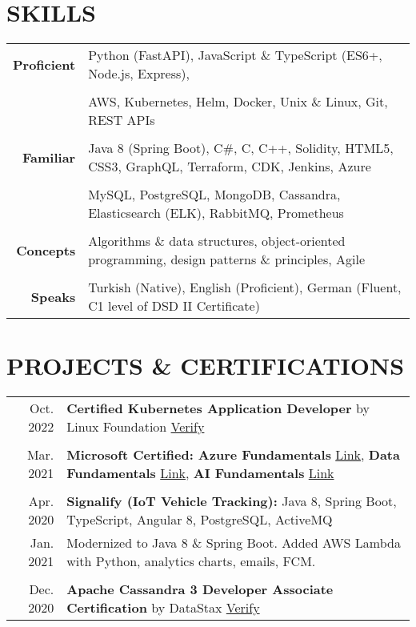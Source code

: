 \documentclass[a4paper, 10pt]{article}
\begin{document}
\section{SKILLS}
{\renewcommand{\arraystretch}{0.7}
\begin{tabular}{r p{15.4cm}}
    \textbf{Proficient} & Python (FastAPI), JavaScript \& TypeScript (ES6+, Node.js, Express),\\\\
    & AWS, Kubernetes, Helm, Docker, Unix \& Linux, Git, REST APIs\\\\
    \textbf{Familiar} & Java 8 (Spring Boot), C\#, C, C++, Solidity, HTML5, CSS3, GraphQL, Terraform, CDK, Jenkins, Azure\\\\
    & MySQL, PostgreSQL, MongoDB, Cassandra, Elasticsearch (ELK), RabbitMQ, Prometheus\\\\
    \textbf{Concepts} & Algorithms \& data structures, object-oriented programming, design patterns \& principles, Agile\\\\
    \textbf{Speaks} & Turkish (Native), English (Proficient), German (Fluent, C1 level of DSD II Certificate)
\end{tabular}}

\section{PROJECTS \& CERTIFICATIONS}
\begin{tabular}{r p{15.7cm}}
    Oct. 2022 & \textbf{Certified Kubernetes Application Developer} by Linux Foundation \hspace{0.5em} \href{https://www.credly.com/badges/b500e17d-c2e5-48cd-ad7c-5dfdd9cfedd4}{Verify}\\\\
    Mar. 2021 & \textbf{Microsoft Certified: Azure Fundamentals} \href{https://www.credly.com/badges/18da888a-9cbd-49d8-b923-7c7fe752fbab}{Link}, \textbf{Data Fundamentals} \href{https://www.credly.com/badges/3cc1890b-1881-48c4-9c25-d960e14fbdee}{Link}, \textbf{AI Fundamentals} \href{https://www.credly.com/badges/b96505f9-33f9-47e0-91bd-2c8fd73ecffb}{Link}\\\\
    Apr. 2020 &  \textbf{Signalify (IoT Vehicle Tracking):} Java 8, Spring Boot, TypeScript, Angular 8, PostgreSQL, ActiveMQ\\
    Jan. 2021 & Modernized to Java 8 \& Spring Boot. Added AWS Lambda with Python, analytics charts, emails, FCM.\\\\
    Dec. 2020 & \textbf{Apache Cassandra 3 Developer Associate Certification} by DataStax \hspace{0.5em} \href{https://certification.mettl.com/datastax/applicant/result/download-certificate?key=v2gAI\%2BtQJaGeWin6S7cSag\%3D\%3D}{Verify}
\end{tabular}
\end{document}
